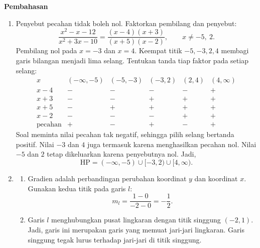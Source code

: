 \documentclass[10pt,letterpaper]{article}
\begin{document}
\newpage
\begingroup
\fontsize{10.95}{13.5}\selectfont
\setlength{\parskip}{3pt}
\textbf{\large Pembahasan}\par\medskip
\begin{enumerate}

  \item Penyebut pecahan tidak boleh nol.
        Faktorkan pembilang dan penyebut:
        \[
          \frac{x^2-x-12}{x^2+3x-10}
          =\frac{(x-4)(x+3)}{(x+5)(x-2)},\qquad x\ne-5,\ 2.
        \]
        Pembilang nol pada $x=-3$ dan $x=4$.
        Keempat titik $-5,-3,2,4$ membagi garis bilangan menjadi lima selang.
        Tentukan tanda tiap faktor pada setiap selang:
        \[
          \begin{array}{c|ccccc}
            x              & (-\infty,-5) & (-5,-3) & (-3,2) & (2,4) & (4,\infty) \\ \hline
            x-4            & -            & -       & -      & -     & +          \\
            x+3            & -            & -       & +      & +     & +          \\
            x+5            & -            & +       & +      & +     & +          \\
            x-2            & -            & -       & -      & +     & +          \\ \hline
            \text{pecahan} & +            & -       & +      & -     & +
          \end{array}
        \]
        Soal meminta nilai pecahan tak negatif, sehingga pilih selang bertanda positif.
        Nilai $-3$ dan $4$ juga termasuk karena menghasilkan pecahan nol.
        Nilai $-5$ dan $2$ tetap dikeluarkan karena penyebutnya nol.
        Jadi,
        \[
          \boxed{\mathrm{HP}=(-\infty,-5)\cup[-3,2)\cup[4,\infty)}.
        \]

  \item \begin{enumerate}
          \item Gradien adalah perbandingan perubahan koordinat $y$ dan koordinat $x$.
                Gunakan kedua titik pada garis $l$:
                \[
                  m_l=\frac{1-0}{-2-0}=\boxed{-\frac12}.
                \]

          \item Garis $l$ menghubungkan pusat lingkaran dengan titik singgung $(-2,1)$.
                Jadi, garis ini merupakan garis yang memuat jari-jari lingkaran.
                Garis singgung tegak lurus terhadap jari-jari di titik singgung.


\end{enumerate}
\end{enumerate}
\end{document}
